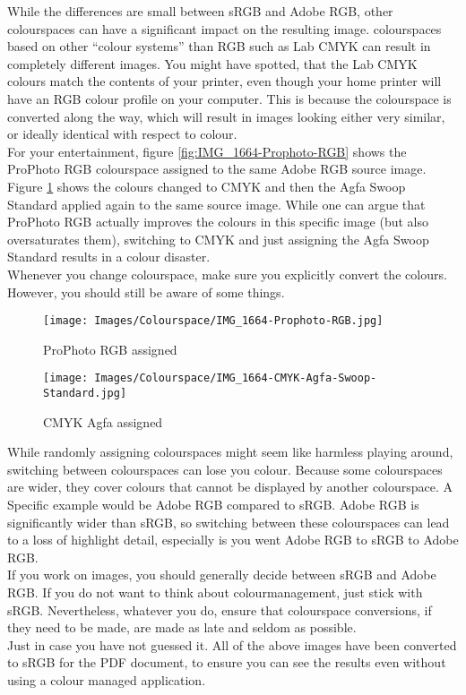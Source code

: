 While the differences are small between sRGB and Adobe RGB, other \glspl{colourspace} can have a significant impact on the resulting image. \Glspl{colourspace} based on other ``colour systems'' than RGB such as Lab CMYK can result in completely different images. You might have spotted, that the Lab CMYK colours match the contents of your printer, even though your home printer will have an RGB colour profile on your computer. This is because the \gls{colourspace} is converted along the way, which will result in images looking either very similar, or ideally identical with respect to colour.
\\[\baselineskip]
For your entertainment, figure \ref{fig:IMG_1664-Prophoto-RGB} shows the ProPhoto RGB \gls{colourspace} assigned to the same Adobe RGB source image. Figure \ref{fig:IMG_1664-CMYK-Agfa-Swoop-Standard} shows the colours changed to CMYK and then the Agfa Swoop Standard applied again to the same source image. While one can argue that ProPhoto RGB actually improves the colours in this specific image (but also oversaturates them), switching to CMYK and just assigning the Agfa Swoop Standard results in a colour disaster.
\\
Whenever you change \gls{colourspace}, make sure you explicitly convert the colours. However, you should still be aware of some things.

\begin{figure}[htb]
\begin{minipage}{.5\textwidth}
	\centering
		\texttt{[image: Images/Colourspace/IMG\_1664-Prophoto-RGB.jpg]}
	\caption{ProPhoto RGB assigned}
	\label{fig:IMG_1664-Prophoto-RGB}
\end{minipage}
\begin{minipage}{.5\textwidth}
	\centering
		\texttt{[image: Images/Colourspace/IMG\_1664-CMYK-Agfa-Swoop-Standard.jpg]}
	\caption{CMYK Agfa assigned}
	\label{fig:IMG_1664-CMYK-Agfa-Swoop-Standard}
	\end{minipage}
\end{figure}

While randomly assigning \glspl{colourspace} might seem like harmless playing around, switching between \glspl{colourspace} can lose you colour. Because some \glspl{colourspace} are wider, they cover colours that cannot be displayed by another \gls{colourspace}. A Specific example would be Adobe RGB compared to sRGB. Adobe RGB is significantly wider than sRGB, so switching between these \glspl{colourspace} can lead to a loss of highlight detail, especially is you went Adobe RGB to sRGB to Adobe RGB.
\\[\baselineskip]
If you work on images, you should generally decide between sRGB and Adobe RGB. If you do not want to think about \gls{colourmanagement}, just stick with sRGB. Nevertheless, whatever you do, ensure that \gls{colourspace} conversions, if they need to be made, are made as late and seldom as possible.
\\[\baselineskip]
Just in case you have not guessed it. All of the above images have been converted to sRGB for the PDF document, to ensure you can see the results even without using a colour managed application.

